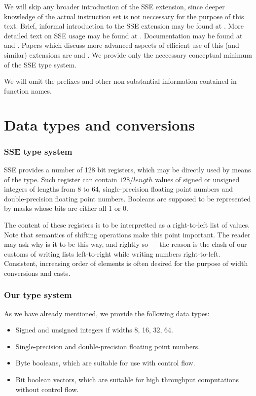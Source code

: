 We will skip any broader introduction of the SSE extension, since deeper knowledge of the actual instruction set is not neccessary for the purpose of this text. Brief, informal introduction to the SSE extension may be found at \cite{TODO}. More detailed text on SSE usage may be found at \cite{TODO}. Documentation may be found at \cite{TODO} and \cite{TODO}. Papers which discuss more advanced aspects of efficient use of this (and similar) extensions are \cite{TODO} and \cite{TODO}. We provide only the neccessary conceptual minimum of the SSE type system.

We will omit the  prefixes and other non-substantial information contained in function names.

\section{Data types and conversions} 

\subsubsection{SSE type system}

SSE provides a number of 128 bit registers, which may be directly used by means of the  type. Such register can contain $128/length$ values of signed or unsigned integers of lengths from 8 to 64, single-precision floating point numbers and double-precision floating point numbers. Booleans are supposed to be represented by masks whose bits are either all 1 or 0.

The content of these registers is to be interpretted as a right-to-left list of values. Note that semantics of shifting operations make this point important. The reader may ask why is it to be this way, and rightly so --- the reason is the clash of our customs of writing lists left-to-right while writing numbers right-to-left. Consistent, increasing order of elements is often desired for the purpose of width conversions and casts.

\subsubsection{Our type system}

As we have already mentioned, we provide the following data types:
\begin{itemize}
\item Signed and unsigned integers if widths 8, 16, 32, 64.
\item Single-precision and double-precision floating point numbers.
\item Byte booleans, which are suitable for use with control flow.
\item Bit boolean vectors, which are suitable for high throughput computations without control flow.
\end{itemize}

